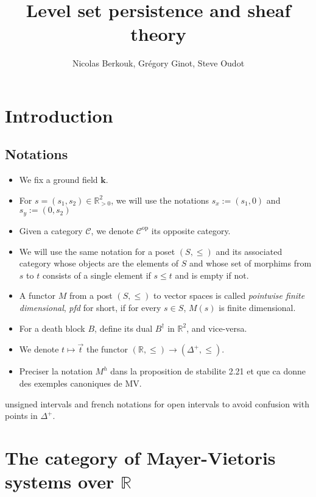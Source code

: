 \documentclass[a4paper, english, 11pt]{article}
\author{Nicolas Berkouk, Grégory Ginot, Steve Oudot}
\newcommand{\kk}[0]{\textbf{k}}
\newcommand{\0}{\vec{0}}
\newcommand{\R}[0]{\mathbb{R}}
\newcommand{\C}[0]{\mathcal{C}}
\newcommand{\op}[0]{\text{op}}
\begin{document}

\title{Level set persistence and sheaf theory}
\maketitle
\begin{abstract}
   
\end{abstract}

\tableofcontents

\section{Introduction}

\subsection{Notations}

\begin{itemize}
\item We fix a ground field $\kk$.
    \item For $s=(s_1,s_2)\in \R^2_{>0}$, we will use the notations $s_x:=(s_1,0)$ and $s_y := (0,s_2)$
    \item Given a category $\C$, we denote $\C^{\op}$ its opposite category. 
    \item We will use the same notation for a poset $(S, \leq)$ and its associated  category whose objects are the elements of $S$ and whose set of morphims from  $s$ to $t$ consists of a single element if $s\leq t$ and is empty if not.
    \item A functor $M$ from a post $(S, \leq)$ to vector spaces is called \emph{pointwise finite dimensional}, \emph{pfd} for short, if for every $s\in S$, $M(s)$ is finite dimensional. 
    \item For a death block $B$, define its dual $B^\dag$ in $\R^2$, and vice-versa.
    \item We denote $t\mapsto \vec{t}$ the functor $(\R ,\leq) \to (\Delta^+, \leq)$.
    \item Preciser la notation $M^h$ dans la proposition de stabilite 2.21 et que ca donne des exemples canoniques de MV.
\end{itemize}

unsigned intervals and french notations for open intervals to avoid confusion with points in $\Delta^+$.

\section{The category of Mayer-Vietoris systems over $\R$}
\end{document}
